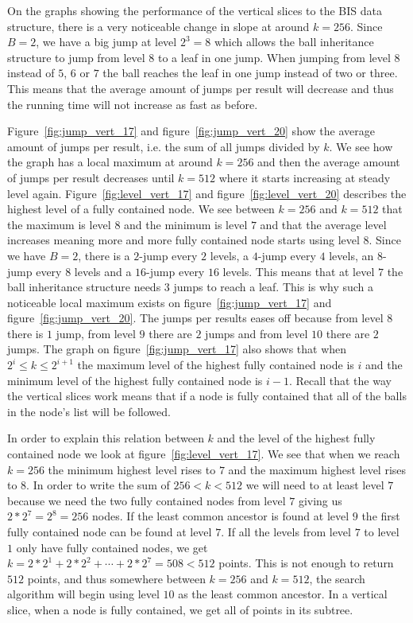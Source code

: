 On the graphs showing the performance of the vertical slices to the BIS data structure, there is a very noticeable change in slope at around $k=256$. Since $B=2$, we have a big jump at level $2^3 = 8$ which allows the ball inheritance structure to jump from level $8$ to a leaf in one jump. When jumping from level $8$ instead of $5$, $6$ or $7$ the ball reaches the leaf in one jump instead of two or three. This means that the average amount of jumps per result will decrease and thus the running time will not increase as fast as before.

Figure~\ref{fig:jump_vert_17} and figure~\ref{fig:jump_vert_20} show the average amount of jumps per result, i.e. the sum of all jumps divided by $k$. We see how the graph has a local maximum at around $k=256$ and then the average amount of jumps per result decreases until $k=512$ where it starts increasing at steady level again. Figure~\ref{fig:level_vert_17} and figure~\ref{fig:level_vert_20} describes the highest level of a fully contained node. We see between $k=256$ and $k=512$ that the maximum is level $8$ and the minimum is level $7$ and that the average level increases meaning more and more fully contained node starts using level $8$. Since we have $B=2$, there is a $2$-jump every $2$ levels, a $4$-jump every $4$ levels, an $8$-jump every $8$ levels and a $16$-jump every $16$ levels. This means that at level $7$ the ball inheritance structure needs $3$ jumps to reach a leaf. This is why such a noticeable local maximum exists on figure~\ref{fig:jump_vert_17} and figure~\ref{fig:jump_vert_20}. The jumps per results eases off because from level $8$ there is $1$ jump, from level $9$ there are $2$ jumps and from level $10$ there are $2$ jumps. The graph on figure~\ref{fig:jump_vert_17} also shows that when $2^i \leq k \leq 2^{i+1}$ the maximum level of the highest fully contained node is $i$ and the minimum level of the highest fully contained node is $i-1$. Recall that the way the vertical slices work means that if a node is fully contained that all of the balls in the node's list will be followed.


In order to explain this relation between $k$ and the level of the highest fully contained node we look at figure~\ref{fig:level_vert_17}. We see that when we reach $k=256$ the minimum highest level rises to $7$ and the maximum highest level rises to $8$. In order to write the sum of $256<k<512$ we will need to at least level $7$ because we need the two fully contained nodes from level $7$ giving us $2*2^7 = 2^8 = 256$ nodes. If the least common ancestor is found at level $9$ the first fully contained node can be found at level $7$. If all the levels from level $7$ to level $1$ only have fully contained nodes, we get $k = 2*2^1 + 2*2^2 + \cdots + 2*2^7 = 508 < 512$ points. This is not enough to return $512$ points, and thus somewhere between $k=256$ and $k=512$, the search algorithm will begin using level $10$ as the least common ancestor. In a vertical slice, when a node is fully contained, we get all of points in its subtree.


